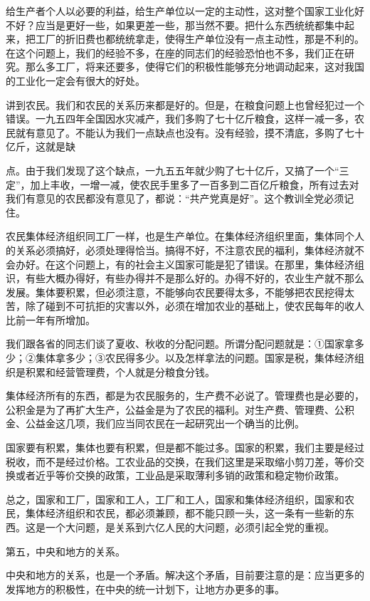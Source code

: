 给生产者个人以必要的利益，给生产单位以一定的主动性，这对整个国家工业化好不好？应当是更好一些，如果更差一些，那当然不要。把什么东西统统都集中起来，把工厂的折旧费也都统统拿走，使得生产单位没有一点主动性，那是不利的。在这个问题上，我们的经验不多，在座的同志们的经验恐怕也不多，我们正在研究。那么多工厂，将来还要多，使得它们的积极性能够充分地调动起来，这对我国的工业化一定会有很大的好处。

讲到农民。我们和农民的关系历来都是好的。但是，在粮食问题上也曾经犯过一个错误。一九五四年全国因水灾减产，我们多购了七十亿斤粮食，这样一减一多，农民就有意见了。不能认为我们一点缺点也没有。没有经验，摸不清底，多购了七十亿斤，这就是缺

点。由于我们发现了这个缺点，一九五五年就少购了七十亿斤，又搞了一个“三定”，加上丰收，一增一减，使农民手里多了一百多到二百亿斤粮食，所有过去对我们有意见的农民都没有意见了，都说：“共产党真是好”。这个教训全党必须记住。

农民集体经济组织同工厂一样，也是生产单位。在集体经济组织里面，集体同个人的关系必须搞好，必须处理得恰当。搞得不好，不注意农民的福利，集体经济就不会办好。在这个问题上，有的社会主义国家可能是犯了错误。在那里，集体经济组识，有些大概办得好，有些办得并不是那么好的。办得不好的，农业生产就不那么发展。集体要积累，但必须注意，不能够向农民要得太多，不能够把农民挖得太苦，除了碰到不可抗拒的灾害以外，必须在增加农业的基础上，使农民每年的收人比前一年有所增加。

我们跟各省的同志们谈了夏收、秋收的分配问题。所谓分配问题就是：①国家拿多少；②集体拿多少；③农民得多少。以及怎样拿法的问题。国家是税，集体经济组织是积累和经营管理费，个人就是分粮食分钱。

集体经济所有的东西，都是为农民服务的，生产费不必说了。管理费也是必要的，公积金是为了再扩大生产，公益金是为了农民的福利。对生产费、管理费、公积金、公益金这几项，我们应当同农民在一起研究出一个确当的比例。

国家要有积累，集体也要有积累，但是都不能过多。国家的积累，我们主要是经过税收，而不是经过价格。工农业品的交换，在我们这里是采取缩小剪刀差，等价交换或者近乎等价交换的政策，工业品是采取薄利多销的政策和稳定物价政策。

总之，国家和工厂，国家和工人，工厂和工人，国家和集体经济组织，国家和农民，集体经济组织和农民，都必须兼顾，都不能只顾一头，这一条有一些新的东西。这是一个大问题，是关系到六亿人民的大问题，必须引起全党的重视。

第五，中央和地方的关系。

中央和地方的关系，也是一个矛盾。解决这个矛盾，目前要注意的是：应当更多的发挥地方的积极性，在中央的统一计划下，让地方办更多的事。

